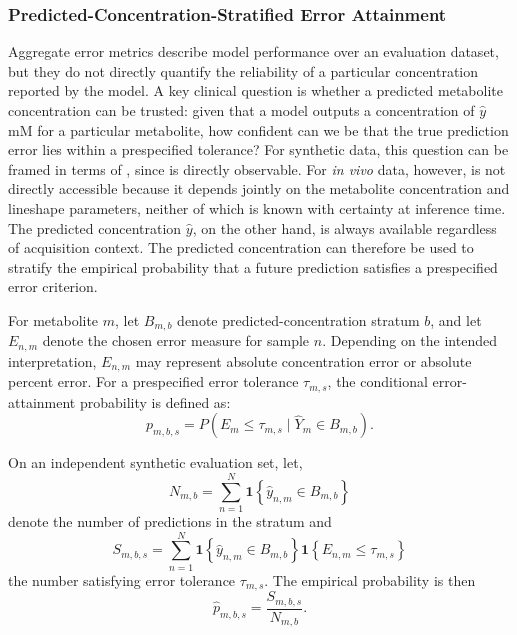 \subsubsection{Predicted-Concentration-Stratified Error Attainment}
\label{sec:Reg:subsec:pred_intervals:subsubsec:conc strat error}
Aggregate error metrics describe model performance over an evaluation dataset, but they do not directly quantify the reliability of a particular concentration reported by the model. A key clinical question is whether a predicted metabolite concentration can be trusted: given that a model outputs a concentration of $\hat{y}$ mM for a particular metabolite, how confident can we be that the true prediction error lies within a prespecified tolerance? For synthetic data, this question can be framed in terms of \mSNR, since \mSNR is directly observable. For \textit{in vivo} data, however, \mSNR is not directly accessible because it depends jointly on the metabolite concentration and lineshape parameters, neither of which is known with certainty at inference time. The predicted concentration $\hat{y}$, on the other hand, is always available regardless of acquisition context. The predicted concentration can therefore be used to stratify the empirical probability that a future prediction satisfies a prespecified error criterion.

For metabolite $m$, let $B_{m,b}$ denote predicted-concen\-tration stratum $b$, and let $E_{n,m}$ denote the chosen error measure for sample $n$. Depending on the intended interpretation, $E_{n,m}$ may represent absolute concentration error or absolute percent error. For a prespecified error tolerance $\tau_{m,s}$, the conditional error-attainment probability is defined as:
\begin{equation}
    p_{m,b,s} = P\left( E_m \leq \tau_{m,s} \mid \hat{Y}_m \in B_{m,b} \right).
\end{equation}

On an independent synthetic evaluation set, let,
\begin{equation}
    N_{m,b} = \sum_{n=1}^{N} \mathbf{1}\left\{\hat{y}_{n,m} \in B_{m,b}\right\}
\end{equation}
denote the number of predictions in the stratum and
\begin{equation}
    S_{m,b,s} = \sum_{n=1}^{N} \mathbf{1}\left\{\hat{y}_{n,m} \in B_{m,b}\right\} \mathbf{1}\left\{E_{n,m}\leq\tau_{m,s}\right\}
\end{equation}
the number satisfying error tolerance $\tau_{m,s}$. The empirical probability is then
\begin{equation}
    \hat p_{m,b,s} = \frac{S_{m,b,s}}{N_{m,b}}.
\end{equation}

